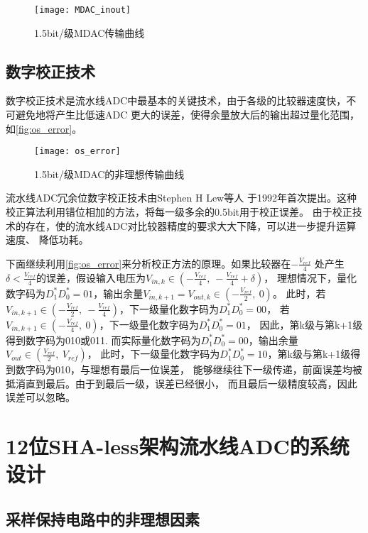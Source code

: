     \begin{figure}[H]
        \centering
        \texttt{[image: MDAC\_inout]}
        \caption{\label{fig:MDAC_inout}1.5bit/级MDAC传输曲线}
    \end{figure}

\subsection{数字校正技术}
    数字校正技术是流水线ADC中最基本的关键技术，由于各级的比较器速度快，不可避免地将产生比低速ADC
    更大的误差，使得余量放大后的输出超过量化范围，如\autoref{fig:os_error}。
    \begin{figure}[H]
        \centering
        \texttt{[image: os\_error]}
        \caption{\label{fig:os_error}1.5bit/级MDAC的非理想传输曲线}
    \end{figure}
    流水线ADC冗余位数字校正技术由Stephen H Lew等人
    于1992年首次提出。这种校正算法利用错位相加的方法，将每一级多余的0.5bit用于校正误差。
    由于校正技术的存在，使的流水线ADC对比较器精度的要求大大下降，可以进一步提升运算速度、
    降低功耗。
    \par 下面继续利用\autoref{fig:os_error}来分析校正方法的原理。如果比较器在$ -\frac{V_{ref}}{4} $
    处产生$ \delta < \frac{V_{ref}}{4} $的误差，假设输入电压为$ V_{in,k} \in (-\frac{V_{ref}}{4},\ -\frac{V_{ref}}{4}+\delta) $，
    理想情况下，量化数字码为$ D_1^*D_0^* = 01 $，输出余量$ V_{in,k+1} = V_{out,k} \in (-\frac{V_{ref}}{2},\ 0) $。
    此时，若$ V_{in,k+1} \in (-\frac{V_{ref}}{2},\ -\frac{V_{ref}}{4}) $，下一级量化数字码为$ D_1^*D_0^* = 00 $，
    若$ V_{in,k+1} \in (-\frac{V_{ref}}{4},\ 0) $，下一级量化数字码为$ D_1^*D_0^* = 01 $，
    因此，第k级与第k+1级得到数字码为010或011.
    而实际量化数字码为$ D_1^*D_0^* = 00 $，输出余量$ V_{out} \in (\frac{V_{ref}}{2},\ V_{ref}) $，
    此时，下一级量化数字码为$ D_1^*D_0^* = 10 $，第k级与第k+1级得到数字码为010，与理想有最后一位误差，
    能够继续往下一级传递，前面误差均被抵消直到最后。由于到最后一级，误差已经很小，
    而且最后一级精度较高，因此误差可以忽略。

\section{12位SHA-less架构流水线ADC的系统设计}

\subsection{采样保持电路中的非理想因素}
